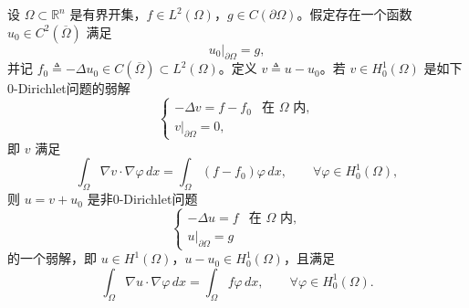 \documentclass[../../main.tex]{subfiles}%
\begin{document}
\begin{proposition}[非0-Dirichlet问题的化归]
设 $\Omega \subset \mathbb{R}^n$ 是有界开集，$f \in L^2(\Omega)$，$g \in C(\partial\Omega)$。假定存在一个函数 $u_0 \in C^2(\overline{\Omega})$ 满足
\[
u_0|_{\partial\Omega} = g,
\]
并记 $f_0 \triangleq -\Delta u_0 \in C(\overline{\Omega}) \subset L^2(\Omega)$。定义 $v \triangleq u - u_0$。若 $v \in H_0^1(\Omega)$ 是如下0-Dirichlet问题的弱解
\[
\begin{cases}
-\Delta v = f - f_0 & \text{在 } \Omega \text{ 内},\\
v|_{\partial\Omega} = 0,
\end{cases}
\]
即 $v$ 满足
\[
\int_\Omega \nabla v \cdot \nabla \varphi \,dx = \int_\Omega (f - f_0)\varphi \,dx, \qquad \forall \varphi \in H_0^1(\Omega),
\]
则 $u = v + u_0$ 是非0-Dirichlet问题
\[
\begin{cases}
-\Delta u = f & \text{在 } \Omega \text{ 内},\\
u|_{\partial\Omega} = g
\end{cases}
\]
的一个弱解，即 $u \in H^1(\Omega)$，$u - u_0 \in H_0^1(\Omega)$，且满足
\[
\int_\Omega \nabla u \cdot \nabla \varphi \,dx = \int_\Omega f \varphi \,dx, \qquad \forall \varphi \in H_0^1(\Omega).
\]
\end{proposition}
\end{document}
